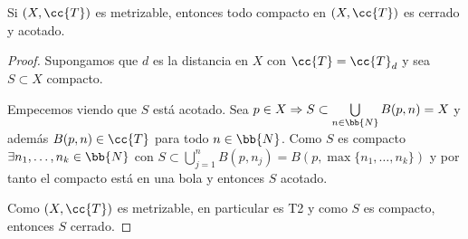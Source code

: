 \begin{coro}
    Si $(X, \cc{T})$ es metrizable, entonces todo compacto en $(X, \cc{T})$ es cerrado y acotado.
    \begin{proof}
        Supongamos que $d$ es la distancia en $X$ con $\cc{T}=\cc{T}_d$ y sea $S\subset X$ compacto. 

        Empecemos viendo que $S$ está acotado. Sea $p\in X \Rightarrow S\subset \bigcup\limits_{n\in \bb{N}}B(p,n)=X$ y además $B(p,n)\in \cc{T}$ para todo $n\in \bb{N}$. Como $S$ es compacto $\exists n_1,\dots,n_k\in \bb{N}$ con $S\subset \bigcup\limits_{j=1}^n B(p,n_j) = B(p,\max\{n_1,\dots,n_k\})$ y por tanto el compacto está en una bola y entonces $S$ acotado.

        Como $(X, \cc{T})$ es metrizable, en particular es T2 y como $S$ es compacto, entonces $S$ cerrado.

    \end{proof}
\end{coro}

